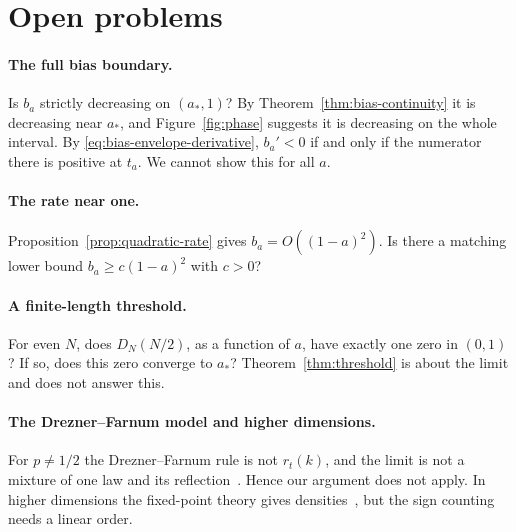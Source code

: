 \section{Open problems}\label{sec:open}

\paragraph{The full bias boundary.}
Is $b_a$ strictly decreasing on $(a_*,1)$? By
Theorem~\ref{thm:bias-continuity} it is decreasing near $a_*$, and
Figure~\ref{fig:phase} suggests it is decreasing on the whole
interval. By \eqref{eq:bias-envelope-derivative}, $b_a'<0$ if and only
if the numerator there is positive at $t_a$. We cannot show this for
all $a$.

\paragraph{The rate near one.}
Proposition~\ref{prop:quadratic-rate} gives $b_a=O((1-a)^2)$. Is there
a matching lower bound $b_a\ge c(1-a)^2$ with $c>0$?

\paragraph{A finite-length threshold.}
For even $N$, does $D_N(N/2)$, as a function of $a$, have exactly one
zero in $(0,1)$? If so, does this zero converge to $a_*$?
Theorem~\ref{thm:threshold} is about the limit and does not answer
this.

\paragraph{The Drezner--Farnum model and higher dimensions.}
For $p\ne1/2$ the Drezner--Farnum rule is not $r_t(k)$, and the limit
is not a mixture of one law and its
reflection~\cite{dreznerfarnum1993}. Hence our argument does not
apply. In higher dimensions the fixed-point theory gives
densities~\cite{glr2026}, but the sign counting needs a linear order.
